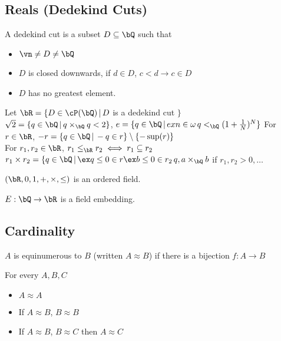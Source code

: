 
\subsection{Reals (Dedekind Cuts)}

\begin{definition}
    A dedekind cut is a subset $D \subseteq \bQ$ such that 
    \begin{itemize}
        \item $\vn \neq D \neq \bQ$ 
        \item $D$ is closed downwards, if $d \in D$, $c < d \to c \in D$ 
        \item $D$ has no greatest element. 
    \end{itemize}
\end{definition}

\noindent
Let $\bR = \{D \in \cP(\bQ) \, | \, D$ is a dedekind cut $\}$ \\
$\sqrt{2} = \{q \in \bQ \, | \, q \times_{\bQ} q < 2\}$, $e = \{q \in \bQ \, | \, ex n \in \omega \, q <_{\bQ} (1 + \frac{1}{N})^N\}$ 
For $r \in \bR$, $-r = \{q \in \bQ \, | \, -q \in r\} \setminus \{-\sup(r)\}$ \\
For $r_1, r_2 \in \bR$, $r_1 \le_{\bR} r_2 \iff r_1 \subseteq r_2$ \\
$r_1 \times r_2 = \{q \in \bQ \, | \, \ex q \le 0 \in r \ex b \le 0 \in r_2 \, q , a \times_{\bQ} b$ if $r_1, r_2 > 0, \ldots$ 

\begin{theorem}
    $(\bR, 0, 1, + , \times, \le)$ is an ordered field. 
\end{theorem}

\noindent
$E: \bQ \to \bR$ is a field embedding. 

\subsection{Cardinality}

\begin{definition}
    $A$ is equinumerous to $B$ (written $A \approx B$) if there is a bijection $f: A \to B$ 
\end{definition}

\begin{theorem}
    For every $A, B, C$ 
    \begin{itemize}
        \item $A \approx A$ 
        \item If $A \approx B$, $B \approx B$ 
        \item If $A \approx B$, $B \approx C$ then $A \approx C$ 
    \end{itemize}
\end{theorem}

